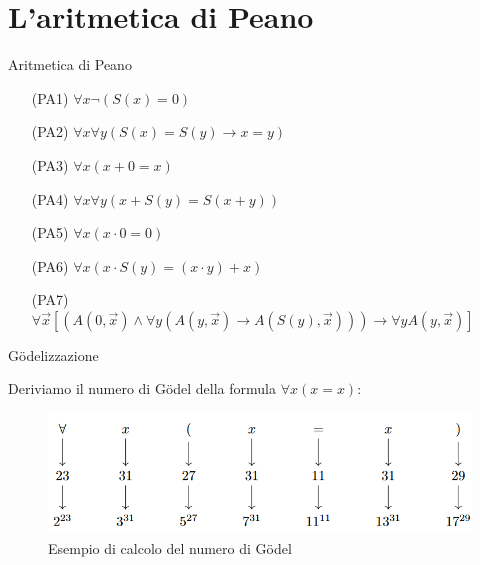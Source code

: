 \documentclass{beamer}
\begin{document}
\section{L'aritmetica di Peano}
\begin{frame}{Aritmetica di Peano}

    \begin{itemize}
        \item[(PA1)] $\forall x \neg (S(x)=0)$
        \item[(PA2)] $\forall x \forall y (S(x)=S(y)\rightarrow x=y)$
        \item[(PA3)] $\forall x (x+0=x)$
        \item[(PA4)] $\forall x \forall y (x+S(y)=S(x+y))$
        \item[(PA5)] $\forall x (x\cdot 0=0)$
        \item[(PA6)] $\forall x (x\cdot S(y)=(x\cdot y)+x)$
        \item[(PA7)] $\forall \vec{x} [(A(0,\vec{x})\land \forall y (A(y,\vec{x})\rightarrow A(S(y),\vec{x})))\rightarrow\forall y A(y,\vec{x})]$
    \end{itemize}

\end{frame}





\begin{frame}{Gödelizzazione}

Deriviamo il numero di G\"odel della formula $\forall x (x=x)$:
\begin{figure}
    \centering
    \includegraphics[scale=0.7]{godel.png}
    \caption{Esempio di calcolo del numero di G\"odel}
    \label{fig:enter-label}
\end{figure}



\end{frame}
\end{document}

